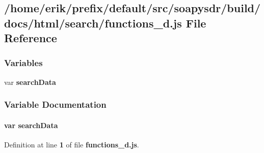 \subsection{/home/erik/prefix/default/src/soapysdr/build/docs/html/search/functions\+\_\+d.js File Reference}
\label{functions__d_8js}
\subsubsection*{Variables}
\begin{DoxyCompactItemize}
\item 
var {\bf search\+Data}
\end{DoxyCompactItemize}


\subsubsection{Variable Documentation}
\paragraph[{search\+Data}]{\setlength{\rightskip}{0pt plus 5cm}var search\+Data}\label{functions__d_8js_ad01a7523f103d6242ef9b0451861231e}


Definition at line {\bf 1} of file {\bf functions\+\_\+d.\+js}.

